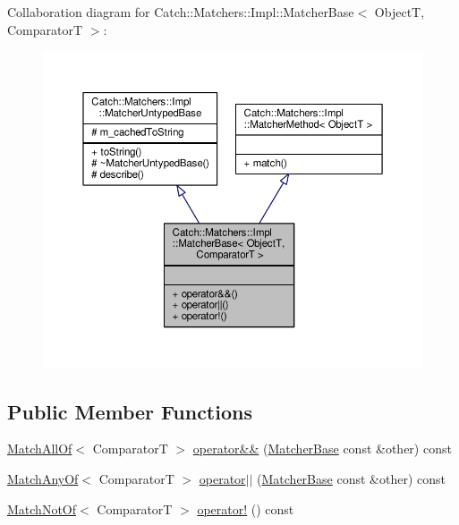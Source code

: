Collaboration diagram for Catch\-:\-:Matchers\-:\-:Impl\-:\-:Matcher\-Base$<$ Object\-T, Comparator\-T $>$\-:
\nopagebreak
\begin{figure}[H]
\begin{center}
\leavevmode
\includegraphics[width=350pt]{struct_catch_1_1_matchers_1_1_impl_1_1_matcher_base__coll__graph}
\end{center}
\end{figure}
\subsection*{Public Member Functions}
\begin{DoxyCompactItemize}
\item 
\hyperlink{struct_catch_1_1_matchers_1_1_impl_1_1_match_all_of}{Match\-All\-Of}$<$ Comparator\-T $>$ \hyperlink{struct_catch_1_1_matchers_1_1_impl_1_1_matcher_base_a0a81a1cf1955daf438fba5607e036e56}{operator\&\&} (\hyperlink{struct_catch_1_1_matchers_1_1_impl_1_1_matcher_base}{Matcher\-Base} const \&other) const 
\item 
\hyperlink{struct_catch_1_1_matchers_1_1_impl_1_1_match_any_of}{Match\-Any\-Of}$<$ Comparator\-T $>$ \hyperlink{struct_catch_1_1_matchers_1_1_impl_1_1_matcher_base_a5241c16329b71ce181c3f3fd599d6e06}{operator$\vert$$\vert$} (\hyperlink{struct_catch_1_1_matchers_1_1_impl_1_1_matcher_base}{Matcher\-Base} const \&other) const 
\item 
\hyperlink{struct_catch_1_1_matchers_1_1_impl_1_1_match_not_of}{Match\-Not\-Of}$<$ Comparator\-T $>$ \hyperlink{struct_catch_1_1_matchers_1_1_impl_1_1_matcher_base_a1c40d784bc484b968bdda10b076709c2}{operator!} () const 
\end{DoxyCompactItemize}

